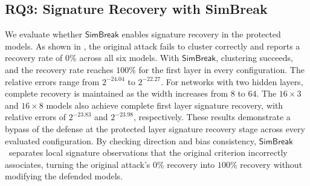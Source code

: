 \documentclass[runningheads]{llncs}
\newcommand{\ours}{{$\mathsf{SimBreak}$}\xspace}
\begin{document}
\subsection{RQ3: Signature Recovery with \textbf{\textsf{SimBreak}}}\label{sec:experiments:rq3}

We evaluate whether \ours enables signature recovery in the protected models.
As shown in , the original attack fails to cluster correctly and reports a recovery rate of $0\%$ across all six models.
With \ours, clustering succeeds, and the recovery rate reaches $100\%$ for the first layer in every configuration.
The relative errors range from $2^{-24.04}$ to $2^{-22.27}$.
For networks with two hidden layers, complete recovery is maintained as the width increases from $8$ to $64$.
The $16\times3$ and $16\times8$ models also achieve complete first layer signature recovery, with relative errors of $2^{-23.83}$ and $2^{-23.98}$, respectively.
These results demonstrate a bypass of the defense at the protected layer signature recovery stage across every evaluated configuration.
By checking direction and bias consistency, \ours~separates local signature observations that the original criterion incorrectly associates, turning the original attack's $0\%$ recovery into $100\%$ recovery without modifying the defended models.
\end{document}
